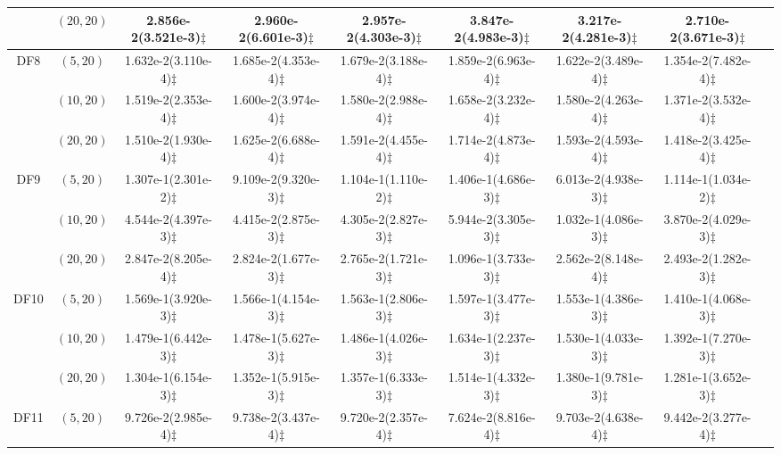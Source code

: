 \documentclass[review]{elsarticle}
\begin{document}
\begin{table*}[!tbh]
{{\begin{tabular} {ccccccccc}
&$(20,20)$ &2.856e-2(3.521e-3)$\ddagger$ &2.960e-2(6.601e-3)$\ddagger$ &2.957e-2(4.303e-3)$\ddagger$ &3.847e-2(4.983e-3)$\ddagger$ &3.217e-2(4.281e-3)$\ddagger$ &2.710e-2(3.671e-3)$\ddagger$ \\
\hline  \multirow{3}{*}{DF8}
&$(5,20)$ &1.632e-2(3.110e-4)$\ddagger$ &1.685e-2(4.353e-4)$\ddagger$ &1.679e-2(3.188e-4)$\ddagger$ &1.859e-2(6.963e-4)$\ddagger$ &1.622e-2(3.489e-4)$\ddagger$ &1.354e-2(7.482e-4)$\ddagger$ \\
&$(10,20)$ &1.519e-2(2.353e-4)$\ddagger$ &1.600e-2(3.974e-4)$\ddagger$ &1.580e-2(2.988e-4)$\ddagger$ &1.658e-2(3.232e-4)$\ddagger$ &1.580e-2(4.263e-4)$\ddagger$ &1.371e-2(3.532e-4)$\ddagger$ \\
&$(20,20)$ &1.510e-2(1.930e-4)$\ddagger$ &1.625e-2(6.688e-4)$\ddagger$ &1.591e-2(4.455e-4)$\ddagger$ &1.714e-2(4.873e-4)$\ddagger$ &1.593e-2(4.593e-4)$\ddagger$ &1.418e-2(3.425e-4)$\ddagger$ \\
\hline  \multirow{3}{*}{DF9}
&$(5,20)$ &1.307e-1(2.301e-2)$\ddagger$ &9.109e-2(9.320e-3)$\ddagger$ &1.104e-1(1.110e-2)$\ddagger$ &1.406e-1(4.686e-3)$\ddagger$ &6.013e-2(4.938e-3)$\ddagger$ &1.114e-1(1.034e-2)$\ddagger$ \\
&$(10,20)$ &4.544e-2(4.397e-3)$\ddagger$ &4.415e-2(2.875e-3)$\ddagger$ &4.305e-2(2.827e-3)$\ddagger$ &5.944e-2(3.305e-3)$\ddagger$ &1.032e-1(4.086e-3)$\ddagger$ &3.870e-2(4.029e-3)$\ddagger$ \\
&$(20,20)$ &2.847e-2(8.205e-4)$\ddagger$ &2.824e-2(1.677e-3)$\ddagger$ &2.765e-2(1.721e-3)$\ddagger$ &1.096e-1(3.733e-3)$\ddagger$ &2.562e-2(8.148e-4)$\ddagger$ &2.493e-2(1.282e-3)$\ddagger$ \\
\hline  \multirow{3}{*}{DF10}
&$(5,20)$ &1.569e-1(3.920e-3)$\ddagger$ &1.566e-1(4.154e-3)$\ddagger$ &1.563e-1(2.806e-3)$\ddagger$ &1.597e-1(3.477e-3)$\ddagger$ &1.553e-1(4.386e-3)$\ddagger$ &1.410e-1(4.068e-3)$\ddagger$ \\
&$(10,20)$ &1.479e-1(6.442e-3)$\ddagger$ &1.478e-1(5.627e-3)$\ddagger$ &1.486e-1(4.026e-3)$\ddagger$ &1.634e-1(2.237e-3)$\ddagger$ &1.530e-1(4.033e-3)$\ddagger$ &1.392e-1(7.270e-3)$\ddagger$ \\
&$(20,20)$ &1.304e-1(6.154e-3)$\ddagger$ &1.352e-1(5.915e-3)$\ddagger$ &1.357e-1(6.333e-3)$\ddagger$ &1.514e-1(4.332e-3)$\ddagger$ &1.380e-1(9.781e-3)$\ddagger$ &1.281e-1(3.652e-3)$\ddagger$ \\
\hline  \multirow{3}{*}{DF11}
&$(5,20)$ &9.726e-2(2.985e-4)$\ddagger$ &9.738e-2(3.437e-4)$\ddagger$ &9.720e-2(2.357e-4)$\ddagger$ &7.624e-2(8.816e-4)$\ddagger$ &9.703e-2(4.638e-4)$\ddagger$ &9.442e-2(3.277e-4)$\ddagger$ \\

\end{tabular}}}
\end{table*}
\end{document}
